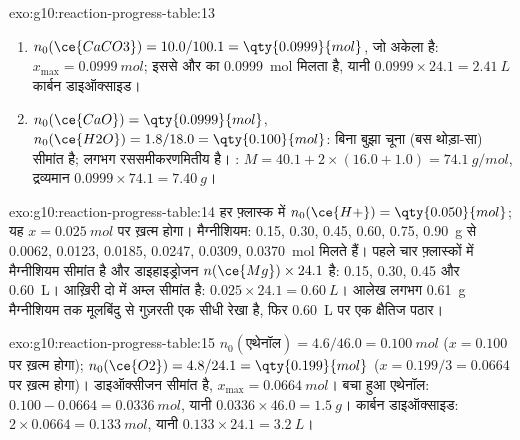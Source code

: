 \begin{solution}{exo:g10:reaction-progress-table:13}
\begin{enumerate}
  \item $n_0(\ce{CaCO3}) = 10.0 / 100.1 = \qty{0.0999}{mol}$, जो अकेला
         है: $x_{\max} = \qty{0.0999}{mol}$; इससे  और 
        का \qty{0.0999}{mol} मिलता है, यानी
        $0.0999 \times 24.1 = \qty{2.41}{L}$ कार्बन डाइऑक्साइड।
  \item $n_0(\ce{CaO}) = \qty{0.0999}{mol}$, $n_0(\ce{H2O}) = 1.8 / 18.0
        = \qty{0.100}{mol}$: बिना बुझा चूना (बस थोड़ा-सा) सीमांत है;
         लगभग रससमीकरणमितीय है। :
        $M = 40.1 + 2 \times (16.0 + 1.0) = \qty{74.1}{g/mol}$, द्रव्यमान
        $0.0999 \times 74.1 = \qty{7.40}{g}$।
\end{enumerate}
\end{solution}

\begin{solution}{exo:g10:reaction-progress-table:14}
हर फ़्लास्क में $n_0(\ce{H+}) = \qty{0.050}{mol}$; यह
$x = \qty{0.025}{mol}$ पर ख़त्म होगा। मैग्नीशियम: 0.15, 0.30, 0.45, 0.60, 0.75,
\qty{0.90}{g} से 0.0062, 0.0123, 0.0185, 0.0247, 0.0309,
\qty{0.0370}{mol} मिलते हैं। पहले चार फ़्लास्कों में मैग्नीशियम सीमांत है
और डाइहाइड्रोजन $n(\ce{Mg}) \times 24.1$ है: 0.15, 0.30, 0.45 और
\qty{0.60}{L}। आख़िरी दो में अम्ल सीमांत है: $0.025 \times 24.1
= \qty{0.60}{L}$। आलेख लगभग \qty{0.61}{g} मैग्नीशियम तक मूलबिंदु से गुज़रती
एक सीधी रेखा है, फिर \qty{0.60}{L} पर एक क्षैतिज
पठार।
\end{solution}

\begin{solution}{exo:g10:reaction-progress-table:15}
$n_0(\text{एथेनॉल}) = 4.6 / 46.0 = \qty{0.100}{mol}$ ($x = 0.100$ पर
ख़त्म होगा); $n_0(\ce{O2}) = 4.8 / 24.1 = \qty{0.199}{mol}$
($x = 0.199/3 = 0.0664$ पर ख़त्म होगा)। डाइऑक्सीजन सीमांत है,
$x_{\max} = \qty{0.0664}{mol}$। बचा हुआ एथेनॉल: $0.100 - 0.0664 =
\qty{0.0336}{mol}$, यानी $0.0336 \times 46.0 = \qty{1.5}{g}$। कार्बन
डाइऑक्साइड: $2 \times 0.0664 = \qty{0.133}{mol}$, यानी
$0.133 \times 24.1 = \qty{3.2}{L}$।
\end{solution}

